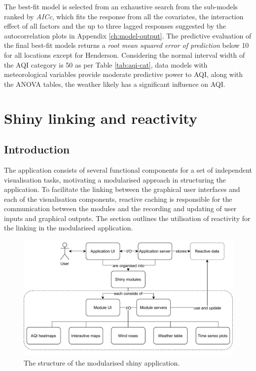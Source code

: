 \documentclass{aucklandthesis}
\begin{document}
The best-fit model is selected from an exhaustive search from the sub-models ranked by \emph{AICc}, which fits the response from all the covariates, the interaction effect of all factors and the up to three lagged responses suggested by the autocorrelation plots in Appendix \ref{ch:model-output}. The predictive evaluation of the final best-fit models returns a \emph{root mean squared error of prediction} below 10 for all locations except for Henderson. Considering the normal interval width of the AQI category is 50 as per Table \ref{tab:aqi-cat}, data models with meteorological variables provide moderate predictive power to AQI, along with the ANOVA tables, the weather likely has a significant influence on AQI.

\hypertarget{ch:linking}{%
\chapter{Shiny linking and reactivity}\label{ch:linking}}

\hypertarget{introduction-2}{%
\section{Introduction}\label{introduction-2}}

The application consists of several functional components for a set of independent visualisation tasks, motivating a modularised approach in structuring the application. To facilitate the linking between the graphical user interfaces and each of the visualisation components, reactive caching is responsible for the communication between the modules and the recording and updating of user inputs and graphical outputs. The section outlines the utilisation of reactivity for the linking in the modularised application.

\begin{figure}
\includegraphics[width=1\linewidth]{figures/app-structure} \caption{The structure of the modularised shiny application.}\label{fig:unnamed-chunk-7}
\end{figure}
\end{document}
